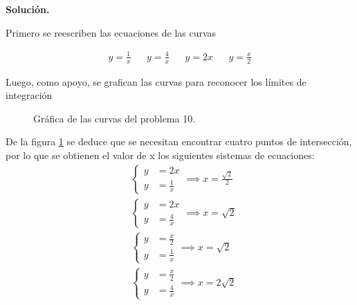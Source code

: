\documentclass[12pt]{article}
\begin{document}
\vspace{5mm}

\noindent \textbf{Solución.}

\vspace{3mm}
Primero se reescriben las ecuaciones de las curvas

\begin{align*}
	y = \frac{1}{x} && y = \frac{4}{x} && y = 2x && y = \frac{x}{2}
\end{align*}

Luego, como apoyo, se grafican las curvas para reconocer los límites de integración
\begin{figure}
\centering
{}
	\caption{Gráfica de las curvas del problema 10.}
	\label{ej10}
\end{figure}

De la figura \ref{ej10} se deduce que se necesitan encontrar cuatro puntos de intersección,
por lo que se obtienen el valor de x los siguientes sistemas de ecuaciones:
\begin{align*}
	&\begin{cases}
		y &= 2x \\
		y &= \frac{1}{x}
	\end{cases}	
	\implies x = \frac{\sqrt{2}}{2}	\\
	&\begin{cases}
		y &= 2x \\
		y &= \frac{4}{x}
	\end{cases}	
	\implies x = \sqrt{2} \\
	&\begin{cases}
		y &= \frac{x}{2} \\
		y &= \frac{1}{x}
	\end{cases}	
	\implies x = \sqrt{2} \\
	&\begin{cases}
		y &= \frac{x}{2} \\
		y &= \frac{4}{x}
	\end{cases}	
	\implies x = 2\sqrt{2} \\
\end{align*}
\end{document}
